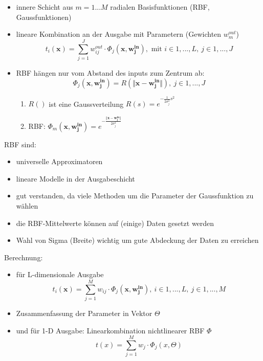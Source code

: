 	\begin{itemize}
		\item innere Schicht aus $m=1...M$ radialen Basisfunktionen (RBF, Gaussfunktionen)
		\item lineare Kombination an der Ausgabe mit Parametern (Gewichten $w_m^{out}$)
		\begin{equation*}
		t_i(\pmb{x})=\sum_{j=1}^Jw_{ij}^{out}\cdot\Phi_j(\pmb{x}, \pmb{w_j^{in}}), \text{ mit } i \in 1,...,L ,~ j\in 1,...,J
		\end{equation*}
		\item RBF hängen nur vom Abstand des inputs zum Zentrum ab:
		\begin{equation*}
			\Phi_j(\pmb{x}, \pmb{w_j^{in}})=R(\Vert\pmb{x}-\pmb{w_j^{in}}\Vert), ~ j \in 1,...,J
		\end{equation*}\vspace*{-15pt}
		\begin{enumerate}[$\hookrightarrow$]
			\item $R()$ ist eine Gaussverteilung $R(s)=e^{-\frac{1}{2\sigma_j^2}s^2}$
			\item RBF: $\Phi_m(\pmb{x}, \pmb{w_j^{in}})=e^{-\frac{\Vert\pmb{x}-\pmb{w_j^{in}}\Vert}{2\sigma_j^2}}$
		\end{enumerate}
	\end{itemize}
	RBF sind:
	\begin{itemize}
		\item universelle Approximatoren
		\item lineare Modelle in der Ausgabeschicht
		\item gut verstanden, da viele Methoden um die Parameter der Gaussfunktion zu wählen
		\item die RBF-Mittelwerte können auf (einige) Daten gesetzt werden
		\item Wahl von Sigma (\dq Breite\dq) wichtig um gute Abdeckung der Daten zu erreichen
	\end{itemize}
	Berechnung:
	\begin{itemize}
		\item für L-dimensionale Ausgabe
		\begin{equation*}
			t_i(\pmb{x}) = \sum_{j=1}^M w_{ij}\cdot\Phi_j(\pmb{x}, \pmb{w_j^{in}}), ~ i\in 1,...,L, ~ j \in 1,...,M
		\end{equation*}
	\item Zusammenfassung der Parameter in Vektor $\Theta$
	\item und für 1-D Ausgabe: Linearkombination nichtlinearer RBF $\Phi$
	\begin{equation*}
		t(x) = \sum_{j=1}^M w_j\cdot\Phi_j(x, \Theta)
	\end{equation*}
	\end{itemize}
